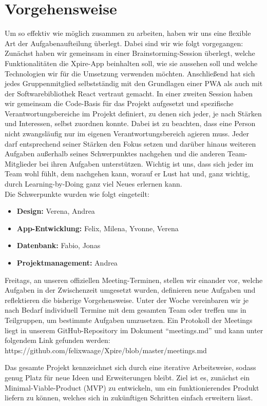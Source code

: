 \section{Vorgehensweise}
Um so effektiv wie möglich zusammen zu arbeiten, haben wir uns eine flexible Art der Aufgabenaufteilung überlegt. Dabei sind wir wie folgt vorgegangen: Zunächst haben wir gemeinsam in einer Brainstorming-Session überlegt, welche Funktionalitäten die Xpire-App beinhalten soll, wie sie aussehen soll und welche Technologien wir für die Umsetzung verwenden möchten. Anschließend hat sich jedes Gruppenmitglied selbstständig mit den Grundlagen einer PWA als auch mit der Softwarebibliothek React vertraut gemacht. In einer zweiten Session haben wir gemeinsam die Code-Basis für das Projekt aufgesetzt und spezifische Verantwortungsbereiche im Projekt definiert, zu denen sich jeder, je nach Stärken und Interessen, selbst zuordnen konnte. Dabei ist zu beachten, dass eine Person nicht zwangsläufig nur im eigenen Verantwortungsbereich agieren muss. Jeder darf entsprechend seiner Stärken den Fokus setzen und darüber hinaus weiteren Aufgaben außerhalb seines Schwerpunktes nachgehen und die anderen Team-Mitglieder bei ihren Aufgaben unterstützen. Wichtig ist uns, dass sich jeder im Team wohl fühlt, dem nachgehen kann, worauf er Lust hat und, ganz wichtig, durch Learning-by-Doing ganz viel Neues erlernen kann.\\
Die Schwerpunkte wurden wie folgt eingeteilt:
\begin{itemize}[noitemsep]
	\item \textbf{Design:} Verena, Andrea
	\item \textbf{App-Entwicklung:} Felix, Milena, Yvonne, Verena
	\item \textbf{Datenbank:} Fabio, Jonas
	\item \textbf{Projektmanagement:} Andrea
\end{itemize}
Freitags, an unseren offiziellen Meeting-Terminen, stellen wir einander vor, welche Aufgaben in der Zwischenzeit umgesetzt wurden, definieren neue Aufgaben und reflektieren die bisherige Vorgehensweise. Unter der Woche vereinbaren wir je nach Bedarf individuell Termine mit dem gesamten Team oder treffen uns in Teilgruppen, um bestimmte Aufgaben umzusetzen. Ein Protokoll der Meetings liegt in unserem GitHub-Repository im Dokument \enquote{meetings.md} und kann unter folgendem Link gefunden werden: https://github.com/felixwaage/Xpire/blob/master/meetings.md

Das gesamte Projekt kennzeichnet sich durch eine iterative Arbeitsweise, sodass genug Platz für neue Ideen und Erweiterungen bleibt. Ziel ist es, zunächst ein Minimal-Viable-Product (MVP) zu entwickeln, um ein funktionierendes Produkt liefern zu können, welches sich in zukünftigen Schritten einfach erweitern lässt.


